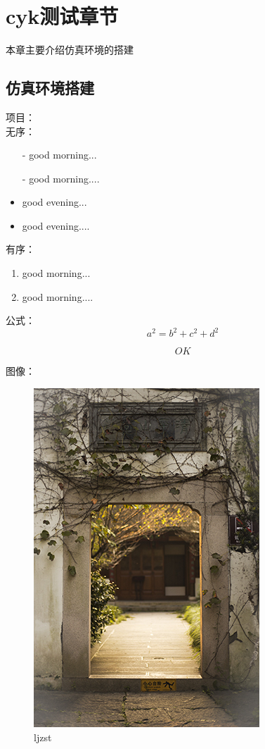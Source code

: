 \chapter{cyk测试章节}

本章主要介绍仿真环境的搭建

\section{仿真环境搭建}

项目：\\
无序：
\begin{itemize}
\item[-] good morning...
\item[-] good morning....
\end{itemize}

\begin{itemize}
\item good evening...
\item good evening....
\end{itemize}

有序：
\begin{enumerate}
\item good morning...
\item good morning....
\end{enumerate}

公式：
\begin{equation}
	a^2=b^2+c^2+d^2
\end{equation}


\begin{equation}
	OK
\end{equation}

图像：
\begin{figure}[htb]
	\centering 
	\includegraphics[scale=1.0]{./Pictures/test.jpg} 
	\caption{ljzst} 
\end{figure}

